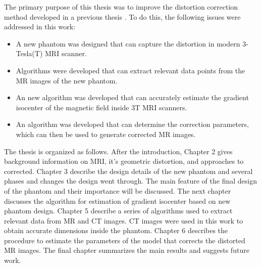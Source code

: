 
The primary purpose of this thesis was to improve the distortion correction method developed in a previous
thesis \cite{tom_thesis}.  To do this, the following issues were addressed in this work:
\begin{itemize}
\item A new phantom was designed that can capture the distortion in modern 3-Tesla(T) MRI scanner.
\item Algorithms were developed that can extract relevant data points from the MR images of the new phantom.
\item An new algorithm was developed that can accurately estimate the gradient isocenter of the magnetic
  field inside 3T MRI scanners.
\item An algorithm was developed that can determine the correction parameters, which can then be used to
  generate corrected MR images.
\end{itemize}

The thesis is organized as follows. After the introduction, Chapter 2 gives background information on MRI,
it's geometric distortion, and approaches to corrected.
Chapter 3 describe the design details of the new phantom and several phases and changes the design
went through. The main feature of the final design of the phantom and their importance will be discussed.
The next chapter discusses the algorithm for estimation of  gradient isocenter based on new
phantom design. %
Chapter 5 describe a series of algorithms used to extract relevant data from MR and CT images. CT images were
used in this work to obtain accurate dimensions inside the phantom.
Chapter 6 describes the procedure to estimate the parameters of the model that corrects the distorted
MR images. The final chapter summarizes the main results and suggests future work.


